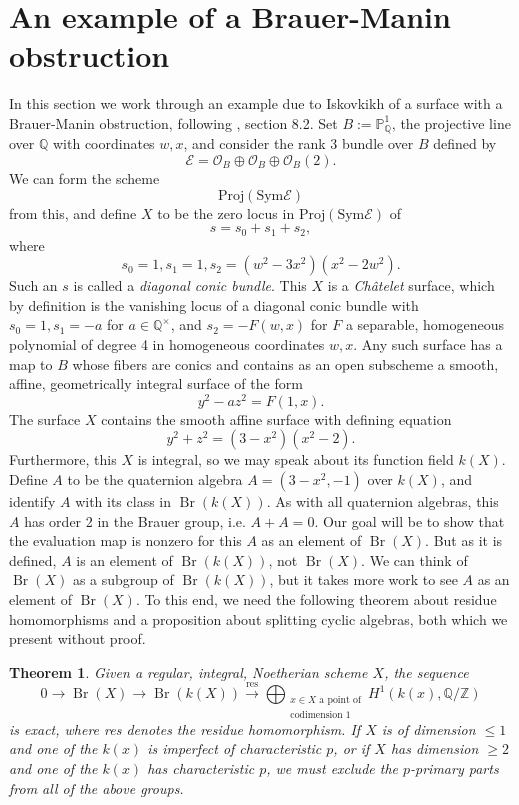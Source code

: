 \documentclass[12pt,twoside]{reedthesis}
\theoremstyle{plain}
\newtheorem{theorem}{Theorem}[chapter]
\theoremstyle{definition}
\theoremstyle{remark}
\newcommand{\ZZ}{\mathbb{Z}}
\newcommand{\QQ}{\mathbb{Q}}
\newcommand{\Proj}{\mathbb{P}}
\newcommand{\calO}{\mathcal{O}}
\newcommand{\Br}{\operatorname{Br}}
\begin{document}
\section{An example of a Brauer-Manin obstruction}
In this section we work through an example due to Iskovkikh of a surface with a Brauer-Manin obstruction, following \cite{qPoints}, section  8.2. Set $B:=\Proj^1_\QQ$, the projective line over $\QQ$ with coordinates $w,x$, and consider the rank 3 bundle over $B$ defined by
\[
\mathscr{E}=\calO_B\oplus\calO_B\oplus\calO_B(2).
\]
We can form the scheme 
\[
\text{Proj}(\text{Sym}\mathscr{E})
\]
from this, and define $X$ to be the zero locus in $\text{Proj}(\text{Sym}\mathscr{E})$ of
\[
s=s_0+s_1+s_2,
\]
where 
\[
s_0=1, s_1=1, s_2=(w^2-3x^2)(x^2-2w^2).
\]
Such an $s$ is called a \emph{diagonal conic bundle}. This $X$ is a \emph{Ch\^atelet} surface, which by definition is the vanishing locus of a diagonal conic bundle with $s_0=1, s_1=-a$ for $a\in\QQ^\times$, and $s_2=-F(w,x)$ for $F$ a separable, homogeneous polynomial of degree 4 in homogeneous coordinates $w,x$. Any such surface has a map to $B$ whose fibers are conics and contains as an open subscheme a smooth, affine, geometrically integral surface of the form
\[
y^2-az^2=F(1,x).
\] 
The surface $X$ contains the smooth affine surface with defining equation
\[
y^2+z^2=(3-x^2)(x^2-2).
\]
Furthermore, this $X$ is integral, so we may speak about its function field $k(X)$. Define $A$ to be the quaternion algebra $A=(3-x^2,-1)$ over $k(X)$, and identify $A$ with its class in $\Br(k(X))$. As with all quaternion algebras, this $A$ has order 2 in the Brauer group, i.e. $A+A=0$. Our goal will be to show that the evaluation map is nonzero for this $A$ as an element of $\Br(X)$. But as it is defined, $A$ is an element of $\Br(k(X))$, not $\Br(X)$. We can think of $\Br(X)$ as a subgroup of $\Br(k(X))$, but it takes more work to see $A$ as an element of $\Br(X)$. To this end, we need the following theorem about residue homomorphisms and a proposition about splitting cyclic algebras, both which we present without proof.
\begin{theorem}
Given a regular, integral, Noetherian scheme $X$, the sequence
\[
0\to\Br(X)\to\Br(k(X))\xrightarrow{\text{res}}\bigoplus_{\substack{x\in X\text{ a point of}\\\text{codimension 1}}}H^1(k(x),\QQ/\ZZ)
\]
is exact, where res denotes the residue homomorphism. If $X$ is of dimension $\leq1$ and one of the $k(x)$ is imperfect of characteristic $p$, or if $X$ has dimension $\geq2$ and one of the $k(x)$ has characteristic $p$, we must exclude the $p$-primary parts from all of the above groups.
\end{theorem}
\end{document}
